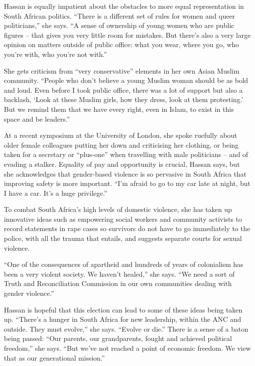 \documentclass[10pt,a4paper]{article}
\begin{document}
\begin{linenumbers}
Hassan is equally impatient about the obstacles to more equal representation in South African politics. “There is a different set of rules for women and queer politicians,” she says. “A sense of ownership of young women who are public figures – that gives you very little room for mistakes. But there’s also a very large opinion on matters outside of public office: what you wear, where you go, who you’re with, who you’re not with.”

She gets criticism from “very conservative” elements in her own Asian Muslim community. “People who don’t believe a young Muslim woman should be as bold and loud. Even before I took public office, there was a lot of support but also a backlash, ‘Look at these Muslim girls, how they dress, look at them protesting.’ But we remind them that we have every right, even in Islam, to exist in this space and be leaders.”

At a recent symposium at the University of London, she spoke ruefully about older female colleagues putting her down and criticising her clothing, or being taken for a secretary or “plus-one” when travelling with male politicians – and of evading a stalker. Equality of pay and opportunity is crucial, Hassan says, but she acknowledges that gender-based violence is so pervasive in South Africa that improving safety is more important. “I’m afraid to go to my car late at night, but I have a car. It’s a huge privilege.”

To combat South Africa’s high levels of domestic violence, she has taken up innovative ideas such as empowering social workers and community activists to record statements in rape cases so survivors do not have to go immediately to the police, with all the trauma that entails, and suggests separate courts for sexual violence.

“One of the consequences of apartheid and hundreds of years of colonialism has been a very violent society. We haven’t healed,” she says. “We need a sort of Truth and Reconciliation Commission in our own communities dealing with gender violence.”

Hassan is hopeful that this election can lead to some of these ideas being taken up. “There’s a hunger in South Africa for new leadership, within the ANC and outside. They must evolve,” she says. “Evolve or die.” There is a sense of a baton being passed: “Our parents, our grandparents, fought and achieved political freedom,” she says. “But we’ve not reached a point of economic freedom. We view that as our generational mission.”


\end{linenumbers}
\end{document}
